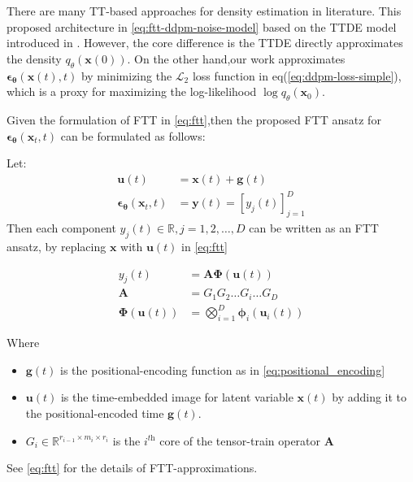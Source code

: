 \documentclass[11pt]{article}
\begin{document}
    There are many TT-based approaches for density estimation in literature\cite{han2024tensor,novikov2022tensortrain}.
    This proposed architecture in \eqref{eq:ftt-ddpm-noise-model} based on the TTDE model introduced in
    \cite{novikov2022tensortrain}.
    However, the core difference is the TTDE directly approximates the density $q_{\theta}(\mathbf{x}(0))$.
    On the other hand,our work approximates $\bm{\epsilon}_{\bm{\theta}}(\mathbf{x}(t),t)$ by minimizing the
    $\mathcal{L}_2$ loss function in eq(\ref{eq:ddpm-loss-simple}), which is a proxy for maximizing
    the log-likelihood $\log q_{\theta}(\mathbf{x}_0)$.

    Given the formulation of FTT in \eqref{eq:ftt},then the proposed FTT ansatz for
    $\boldsymbol{\epsilon}_{\bm{\theta}}\left(\mathbf{x}_t, t\right)$ can be formulated as follows:


    Let:
    \begin{equation}
        \label{eq:ftt-ddpm-formulation-givens}
        \begin{aligned}
            \mathbf{u}(t)&= \mathbf{x}(t) + \mathbf{g}(t) \\
            \boldsymbol{\epsilon}_{\bm{\theta}}\left(\mathbf{x}_t, t\right) &= \mathbf{y}(t)=[y_j(t)]_{j=1}^{D}
        \end{aligned}
    \end{equation}
    Then each component $y_j(t) \in \mathbb{R},j=1,2,\dots,D$ can be written as an FTT ansatz, by replacing $\bm{x}$ with $\bm{u}(t)$
    in \eqref{eq:ftt}

    \begin{subequations}
        \label{ftt-ddmp-noise-model}
        \begin{align}
            y_j(t) &= \mathbf{A}\bm{\Phi}(\mathbf{u}(t))\\
            \mathbf{A} &= G_1 G_2 \dots G_i \dots G_D\\
            \bm{\Phi}(\bm{u}(t)) &= \bigotimes_{i=1}^{D} \bm{\phi}_i(\bm{u}_i(t))
        \end{align}
    \end{subequations}


    Where
    \begin{itemize}
        \item $\mathbf{g}(t)$ is the positional-encoding function as in \eqref{eq:positional_encoding}
        \item $\mathbf{u}(t)$ is the time-embedded image for latent variable $\mathbf{x}(t)$ by adding it to the positional-encoded time $\mathbf{g}(t)$.
        \item $G_i \in \mathbb{R}^{r_{i-1} \times m_i \times r_i}$ is the $i^{\textit{th}}$ core of the tensor-train operator $\bm{A}$
    \end{itemize}
    See \eqref{eq:ftt} for the details of FTT-approximations.
\end{document}
